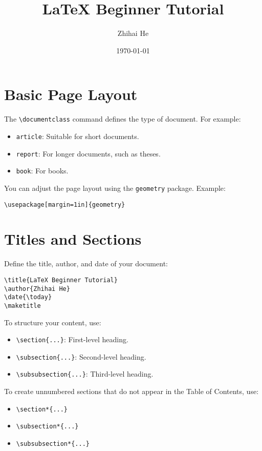 \documentclass[12pt]{article}
\title{LaTeX Beginner Tutorial}
\author{Zhihai He}
\date{\today}
\begin{document}
\maketitle
\tableofcontents
\newpage

\section{Basic Page Layout}
The \texttt{\textbackslash documentclass} command defines the type of document. For example:
\begin{itemize}
    \item \texttt{article}: Suitable for short documents.
    \item \texttt{report}: For longer documents, such as theses.
    \item \texttt{book}: For books.
\end{itemize}

You can adjust the page layout using the \texttt{geometry} package. Example:
\begin{lstlisting}
\usepackage[margin=1in]{geometry}
\end{lstlisting}

\section{Titles and Sections}
Define the title, author, and date of your document:
\begin{lstlisting}
\title{LaTeX Beginner Tutorial}
\author{Zhihai He}
\date{\today}
\maketitle
\end{lstlisting}

To structure your content, use:
\begin{itemize}
    \item \texttt{\textbackslash section\{...\}}: First-level heading.
    \item \texttt{\textbackslash subsection\{...\}}: Second-level heading.
    \item \texttt{\textbackslash subsubsection\{...\}}: Third-level heading.
\end{itemize}

To create unnumbered sections that do not appear in the Table of Contents, use:
\begin{itemize}
    \item \texttt{\textbackslash section*\{...\}}
    \item \texttt{\textbackslash subsection*\{...\}}
    \item \texttt{\textbackslash subsubsection*\{...\}}
\end{itemize}
\end{document}
